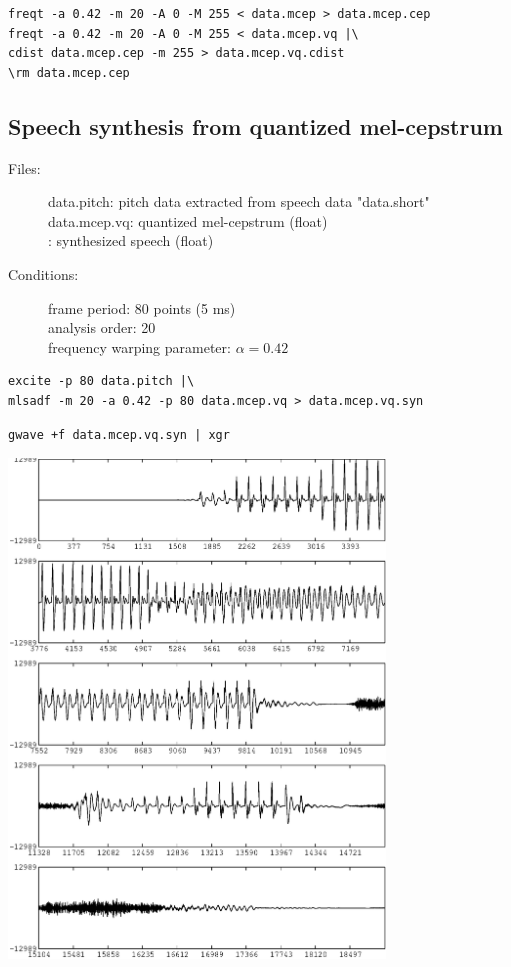 \documentclass[a4paper,10pt]{article}
\begin{document}
\begin{verbatim}
freqt -a 0.42 -m 20 -A 0 -M 255 < data.mcep > data.mcep.cep
freqt -a 0.42 -m 20 -A 0 -M 255 < data.mcep.vq |\
cdist data.mcep.cep -m 255 > data.mcep.vq.cdist
\rm data.mcep.cep
\end{verbatim}

\subsection{Speech synthesis from quantized mel-cepstrum}

\begin{description}
\item[Files:]
  data.pitch: pitch data extracted from speech data "data.short"\\
  data.mcep.vq: quantized mel-cepstrum (float) \\
  :
  synthesized speech (float)
\item[Conditions:]
  frame period: 80 points (5 ms)\\
  analysis order: 20 \\
  frequency warping parameter: $\alpha = 0.42$
\end{description}

\begin{verbatim}
excite -p 80 data.pitch |\
mlsadf -m 20 -a 0.42 -p 80 data.mcep.vq > data.mcep.vq.syn
\end{verbatim}

\begin{verbatim}
gwave +f data.mcep.vq.syn | xgr
\end{verbatim}

\includegraphics[width=10cm]{eps/data.mcep.vq.syn.gwave.eps}
\end{document}
